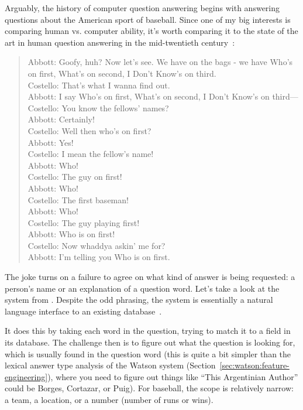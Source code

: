 Arguably, the history of computer question answering begins with
answering questions about the American sport
of baseball.
%
Since one of my big interests is comparing human vs. computer ability, it's
worth comparing it to the state of the art in human question
answering in the mid-twentieth century~\citep{sedman-11}:
\begin{quote}
Abbott: Goofy, huh? Now let's see. We have on the bags - we have Who's on first,
What's on second, I Don't Know's on third. \\
Costello: That's what I wanna find out. \\
Abbott: I say Who's on first, What's on second, I Don't Know's on
third--- \\
Costello: You know the fellows' names? \\
Abbott: Certainly! \\
Costello: Well then who's on first? \\
Abbott: Yes! \\
Costello: I mean the fellow's name! \\
Abbott: Who! \\
Costello: The guy on first! \\
Abbott: Who! \\
Costello: The first baseman! \\
Abbott: Who! \\
Costello: The guy playing first! \\
Abbott: Who is on first! \\
Costello: Now whaddya askin' me for? \\
Abbott: I'm telling you Who is on first. \citep[pages 1002--1004]{light-16}
\end{quote}

The joke turns on a failure to agree on what kind of answer is being
requested: a person's name or an explanation of a question word.
Let’s take a look at the  system
from .
%
Despite the odd phrasing, the  system
 is essentially a natural language
interface to an existing database~\citep{green-61}.

It does this by taking each word in the question,
trying to match it to a field in its database.
%
The challenge then is to figure out what
the question is looking for, which is usually
%
found in the question word (this is quite a bit simpler than the lexical
answer type analysis of the Watson system
(Section~\ref{sec:watson:feature-engineering}), where you need to figure out
things like ``This Argentinian Author'' could be Borges, Cortazar, or
Puig).
%
For baseball, the scope is relatively narrow: a team, a location, or a
number (number of runs or wins).


